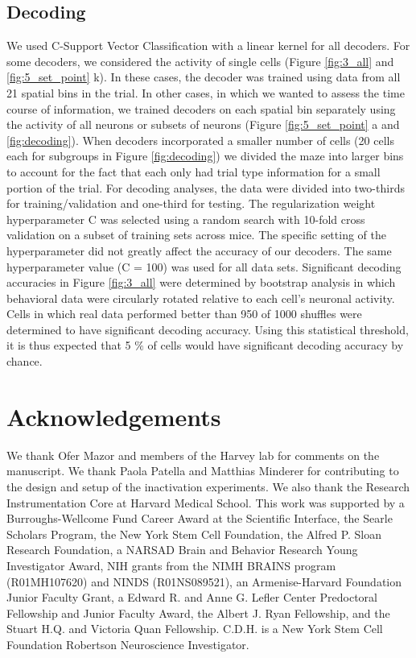 \subsection{Decoding}\label{methods:decoding}
We used C-Support Vector Classification with a linear kernel for all decoders. For some decoders, we considered the activity of single cells (Figure \ref{fig:3_all} and \ref{fig:5_set_point} k). In these cases, the decoder was trained using data from all 21 spatial bins in the trial. In other cases, in which we wanted to assess the time course of information, we trained decoders on each spatial bin separately using the activity of all neurons or subsets of neurons (Figure \ref{fig:5_set_point} a and \ref{fig:decoding}). When decoders incorporated a smaller number of cells (20 cells each for subgroups in Figure \ref{fig:decoding}) we divided the maze into larger bins to account for the fact that each only had trial type information for a small portion of the trial. For decoding analyses, the data were divided into two-thirds for training/validation and one-third for testing. The regularization weight hyperparameter C was selected using a random search with 10-fold cross validation on a subset of training sets across mice. The specific setting of the hyperparameter did not greatly affect the accuracy of our decoders. The same hyperparameter value (C = 100) was used for all data sets. Significant decoding accuracies in Figure \ref{fig:3_all} were determined by bootstrap analysis in which behavioral data were circularly rotated relative to each cell's neuronal activity. Cells in which real data performed better than 950 of 1000 shuffles were determined to have significant decoding accuracy. Using this statistical threshold, it is thus expected that 5 $\%$  of cells would have significant decoding accuracy by chance.

\section{Acknowledgements}
We thank Ofer Mazor and members of the Harvey lab for comments on the manuscript. We thank Paola Patella and Matthias Minderer for contributing to the design and setup of the inactivation experiments. We also thank the Research Instrumentation Core at Harvard Medical School. This work was supported by a Burroughs-Wellcome Fund Career Award at the Scientific Interface, the Searle Scholars Program, the New York Stem Cell Foundation, the Alfred P. Sloan Research Foundation, a NARSAD Brain and Behavior Research Young Investigator Award, NIH grants from the NIMH BRAINS program (R01MH107620) and NINDS (R01NS089521), an Armenise-Harvard Foundation Junior Faculty Grant, a Edward R. and Anne G. Lefler Center Predoctoral Fellowship and Junior Faculty Award, the Albert J. Ryan Fellowship, and the Stuart H.Q. and Victoria Quan Fellowship. C.D.H. is a New York Stem Cell Foundation Robertson Neuroscience Investigator. 

